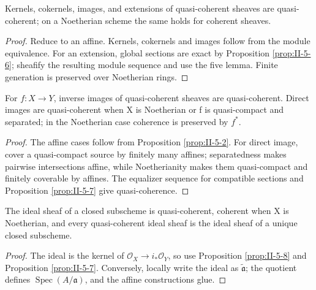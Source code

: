 \begin{proposition}
\label{prop:II-5-7}
Kernels, cokernels, images, and extensions of quasi-coherent sheaves are quasi-coherent; on a
Noetherian scheme the same holds for coherent sheaves.
\end{proposition}
\begin{proof}
Reduce to an affine. Kernels, cokernels and images follow from the module equivalence. For an extension,
global sections are exact by Proposition \ref{prop:II-5-6}; sheafify the resulting module sequence and
use the five lemma. Finite generation is preserved over Noetherian rings.
\end{proof}

\begin{proposition}
\label{prop:II-5-8}
For $f:X\to Y$, inverse images of quasi-coherent sheaves are quasi-coherent. Direct images are
quasi-coherent when X is Noetherian or f is quasi-compact and separated; in the Noetherian case
coherence is preserved by $f^*$.
\end{proposition}
\begin{proof}
The affine cases follow from Proposition \ref{prop:II-5-2}. For direct image, cover a quasi-compact
source by finitely many affines; separatedness makes pairwise intersections affine, while Noetherianity
makes them quasi-compact and finitely coverable by affines. The equalizer sequence for compatible
sections and Proposition \ref{prop:II-5-7} give quasi-coherence.
\end{proof}

\begin{proposition}
\label{prop:II-5-9}
The ideal sheaf of a closed subscheme is quasi-coherent, coherent when X is Noetherian, and every
quasi-coherent ideal sheaf is the ideal sheaf of a unique closed subscheme.
\end{proposition}
\begin{proof}
The ideal is the kernel of $\mathcal O_X\to i_*\mathcal O_Y$, so use Proposition \ref{prop:II-5-8}
and Proposition \ref{prop:II-5-7}. Conversely, locally write the ideal as $\widetilde{\mathfrak a}$;
the quotient defines $\operatorname{Spec}(A/\mathfrak a)$, and the affine constructions glue.
\end{proof}

